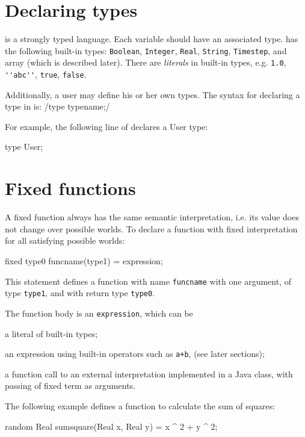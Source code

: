 \documentclass[12pt]{article}
\begin{document}
\section{Declaring types}
\bl is a strongly typed language. Each variable should have an associated type.  \bl has the following built-in types:
\verb|Boolean|, \verb|Integer|, \verb|Real|, \verb|String|, \verb|Timestep|,  and array (which is described later).
There are \emph{literals} in built-in types, e.g. \verb|1.0|, \verb|''abc''|, \verb|true|, \verb|false|.

Additionally, a user may define his or her own types.  The syntax for declaring a type in \bl is:
\blog/type typename;/

For example, the following line of \bl declares a User type:
\begin{blogcode}
type User;
\end{blogcode}


\section{Fixed functions}
A fixed function always has the same semantic interpretation, i.e. its value does not change over possible worlds. 
To declare a function with fixed interpretation for all satisfying possible worlds:
\begin{blogcode}
fixed type0 funcname(type1) = expression;
\end{blogcode}
This statement defines a function with name \texttt{funcname} with one argument, of type \texttt{type1}, and with return type \texttt{type0}. 

The function body is an \texttt{expression}, which can be
\begin{itemize*}
\item a literal of built-in types;
\item an expression using built-in operators  such as \verb|a+b|, (see later sections);
\item a function call to an external interpretation implemented in a Java class, with passing of fixed term as arguments. 
\end{itemize*}

The following example defines a function to calculate the sum of squares:
\begin{blogcode}
random Real sumsquare(Real x, Real y) = x ^ 2 + y ^ 2;
\end{blogcode}
\end{document}
